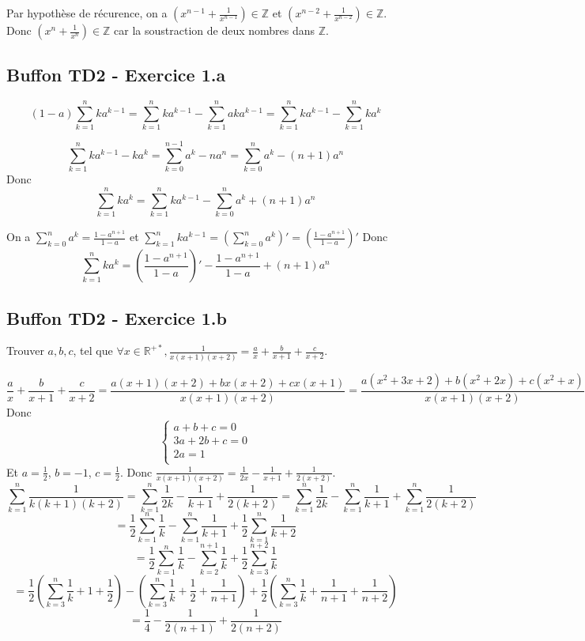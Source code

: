 \documentclass[]{book}
\theoremstyle{definition}
\newcommand{\bb}[1]{\mathbb{#1}}
\newcommand{\Z}{\bb{Z}}
\newcommand{\R}{\bb{R}}
\begin{document}
Par hypoth\`ese de r\'ecurence, on a $\left( x^{n-1} + \frac{1}{x^{n-1}} \right) \in \Z$ et $\left( x^{n-2} + \frac{1}{x^{n-2}} \right) \in \Z$. Donc $\left( x^{n} + \frac{1}{x^{n}} \right) \in \Z$ car la soustraction de deux nombres dans $\Z$.



\subsection*{Buffon TD2 - Exercice 1.a}
$$(1-a)\sum_{k=1}^{n}ka^{k-1} = \sum_{k=1}^{n}ka^{k-1} - \sum_{k=1}^{n}aka^{k-1} = \sum_{k=1}^{n}ka^{k-1} - \sum_{k=1}^{n}ka^{k}$$

$$\sum_{k=1}^{n}{ka^{k-1} - ka^{k}} = \sum_{k=0}^{n-1}{a^k} - na^{n} = \sum_{k=0}^{n}{a^k} - (n+1)a^{n}$$
Donc
$$\sum_{k=1}^{n}ka^{k} = \sum_{k=1}^{n}ka^{k-1} - \sum_{k=0}^{n}{a^k} + (n+1)a^{n}$$

On a $\sum_{k=0}^{n}{a^k} = \frac{1-a^{n+1}}{1-a}$ et $\sum_{k=1}^{n}ka^{k-1} = \left( \sum_{k=0}^{n}{a^k} \right)' = \left( \frac{1-a^{n+1}}{1-a} \right)'$
Donc
$$\sum_{k=1}^{n}ka^{k} = \left( \frac{1-a^{n+1}}{1-a} \right)' - \frac{1-a^{n+1}}{1-a} + (n+1)a^{n} $$

\subsection*{Buffon TD2 - Exercice 1.b}
Trouver $a,b,c$, tel que $\forall x \in \R^{+*},\frac{1}{x(x+1)(x+2)} = \frac{a}{x}+ \frac{b}{x+1}+ \frac{c}{x+2}$.

$$\frac{a}{x}+ \frac{b}{x+1}+ \frac{c}{x+2} = \frac{a(x+1)(x+2)+bx(x+2)+cx(x+1)}{x(x+1)(x+2)} = \frac{a(x^2+3x+2)+b(x^2+2x)+c(x^2+x)}{x(x+1)(x+2)}$$
Donc 
$$
\left\{ 
\begin{array}{l}
a+b+c = 0 \\
3a+2b+c = 0 \\
2a = 1 \\
\end{array}
\right. 
$$
Et $a=\frac{1}{2}$, $b=-1$, $c=\frac{1}{2}$. Donc $\frac{1}{x(x+1)(x+2)} = \frac{1}{2x} - \frac{1}{x+1} + \frac{1}{2(x+2)}$.\\
$$\sum_{k=1}^{n}{\frac{1}{k(k+1)(k+2)}} = \sum_{k=1}^{n}{\frac{1}{2k} - \frac{1}{k+1} + \frac{1}{2(k+2)}} = \sum_{k=1}^{n}{\frac{1}{2k}} - \sum_{k=1}^{n}{\frac{1}{k+1}} + \sum_{k=1}^{n}{\frac{1}{2(k+2)}}$$
$$ = \frac{1}{2}\sum_{k=1}^{n}{\frac{1}{k}} - \sum_{k=1}^{n}{\frac{1}{k+1}} + \frac{1}{2}\sum_{k=1}^{n}{\frac{1}{k+2}}$$
$$ = \frac{1}{2}\sum_{k=1}^{n}{\frac{1}{k}} - \sum_{k=2}^{n+1}{\frac{1}{k}} + \frac{1}{2}\sum_{k=3}^{n+2}{\frac{1}{k}}$$
$$ = \frac{1}{2}(\sum_{k=3}^{n}{\frac{1}{k}}+1+\frac{1}{2}) - (\sum_{k=3}^{n}{\frac{1}{k}}+\frac{1}{2}+\frac{1}{n+1}) + \frac{1}{2}(\sum_{k=3}^{n}{\frac{1}{k}}+\frac{1}{n+1}+\frac{1}{n+2})$$
$$=\frac{1}{4}-\frac{1}{2(n+1)}+\frac{1}{2(n+2)}$$
\end{document}
